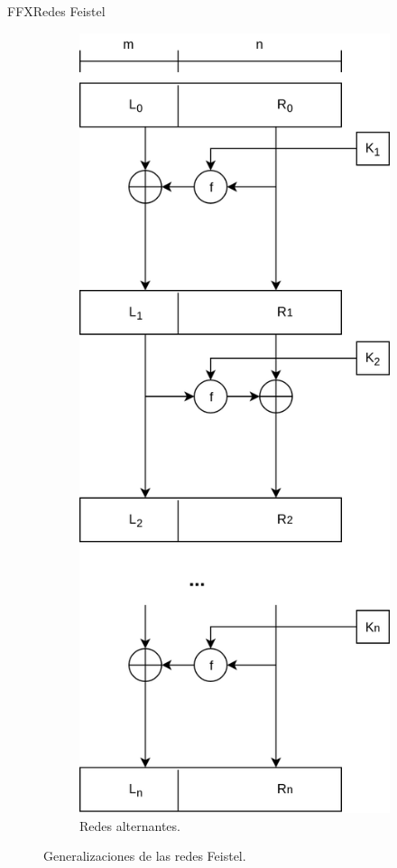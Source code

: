 \begin{frame}{FFX}{Redes Feistel}
{\begin{figure}[H]
\begin{subfigure}{0.45\textwidth}
\begin{center}
          \includegraphics[height=0.65\textheight]
            {../../../diagramas_comunes/redes_feistel/alternantes.png}
          \caption{Redes alternantes.}
        \end{center}
      \end{subfigure}
      \caption{Generalizaciones de las redes Feistel.}
    \end{figure}
  }


\end{frame}
